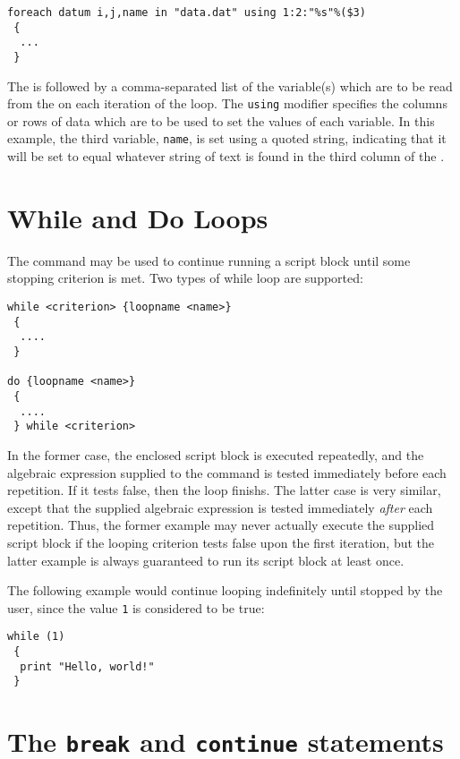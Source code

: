 \begin{verbatim}
foreach datum i,j,name in "data.dat" using 1:2:"%s"%($3)
 {
  ...
 }
\end{verbatim}

The  is followed by a comma-separated list of the
variable(s) which are to be read from the \datafile on each iteration of the
loop. The {\tt using} modifier specifies the columns or rows of data which are
to be used to set the values of each variable. In this example, the third
variable, {\tt name}, is set using a quoted string, indicating that it will be
set to equal whatever string of text is found in the third column of the
\datafile.

\section{While and Do Loops}

The  command may be used to continue running a script block
until some stopping criterion is met. Two types of while loop are supported:

\begin{verbatim}
while <criterion> {loopname <name>}
 {
  ....
 }

do {loopname <name>}
 {
  ....
 } while <criterion>
\end{verbatim}

In the former case, the enclosed script block is executed repeatedly, and the
algebraic expression supplied to the  command is tested
immediately before each repetition. If it tests false, then the loop finishs.
The latter case is very similar, except that the supplied algebraic expression
is tested immediately {\it after} each repetition. Thus, the former example may
never actually execute the supplied script block if the looping criterion tests
false upon the first iteration, but the latter example is always guaranteed to
run its script block at least once.

The following example would continue looping indefinitely until stopped by the
user, since the value {\tt 1} is considered to be true:

\begin{verbatim}
while (1)
 {
  print "Hello, world!"
 }
\end{verbatim}

\section{The {\tt break} and {\tt continue} statements}
\label{sec:breakcontinue}

